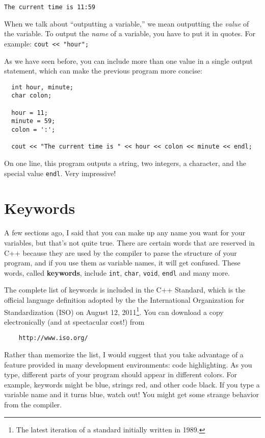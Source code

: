 \begin{lstlisting}
The current time is 11:59
\end{lstlisting}

When we talk about ``outputting a variable,'' we mean outputting the
{\em value} of the variable.  To output the {\em name} of a variable,
you have to put it in quotes.  For example: {\tt cout << "hour";}

As we have seen before, you can include more than one value in
a single output statement, which can make the previous program more
concise:

\begin{lstlisting}
  int hour, minute;
  char colon;

  hour = 11;
  minute = 59;
  colon = ':';

  cout << "The current time is " << hour << colon << minute << endl;
\end{lstlisting}
%
On one line, this program outputs a string, two integers, a character,
and the special value {\tt endl}.  Very impressive!

\section{Keywords}

A few sections ago, I said that you can make up any name you
want for your variables, but that's not quite true.  There
are certain words that are reserved in C++ because they are
used by the compiler to parse the structure of your program,
and if you use them as variable names, it will get confused.
These words, called {\bf keywords}, include {\tt int},
{\tt char}, {\tt void}, {\tt endl} and many more.

The complete list of keywords is included in the C++ Standard, which
is the official language definition adopted by the the International
Organization for Standardization (ISO) on August 12, 2011\footnote{The latest iteration of a standard initially written in 1989.}.  You
can download a copy electronically (and at spectacular cost!) from

\begin{lstlisting}
    http://www.iso.org/
\end{lstlisting}
%
Rather than memorize the list, I would suggest that you
take advantage of a feature provided in many development
environments: code highlighting.  As you type, different
parts of your program should appear in different colors.  For
example, keywords might be blue, strings red, and other code
black.  If you type a variable name and it turns blue, watch
out!  You might get some strange behavior from the compiler.


